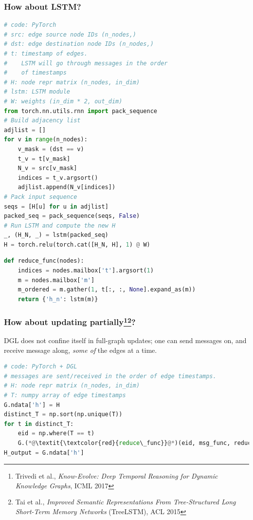 \documentclass[10pt,aspectratio=169]{beamer}
\begin{document}
	\begin{frame}[fragile]
		\frametitle{How about LSTM?}
		\begin{minipage}{0.5\textwidth}
\begin{lstlisting}[language=Python]
# code: PyTorch
# src: edge source node IDs (n_nodes,)
# dst: edge destination node IDs (n_nodes,)
# t: timestamp of edges.
#    LSTM will go through messages in the order
#    of timestamps
# H: node repr matrix (n_nodes, in_dim)
# lstm: LSTM module
# W: weights (in_dim * 2, out_dim)
from torch.nn.utils.rnn import pack_sequence
# Build adjacency list
adjlist = []
for v in range(n_nodes):
    v_mask = (dst == v)
    t_v = t[v_mask]
    N_v = src[v_mask]
    indices = t_v.argsort()
    adjlist.append(N_v[indices])
# Pack input sequence
seqs = [H[u] for u in adjlist]
packed_seq = pack_sequence(seqs, False)
# Run LSTM and compute the new H
_, (H_N, _) = lstm(packed_seq)
H = torch.relu(torch.cat([H_N, H], 1) @ W)
\end{lstlisting}
		\end{minipage}%
		\begin{minipage}{0.5\textwidth}
\begin{lstlisting}[language=Python]
def reduce_func(nodes):
    indices = nodes.mailbox['t'].argsort(1)
    m = nodes.mailbox['m']
    m_ordered = m.gather(1, t[:, :, None].expand_as(m))
    return {'h_n': lstm(m)}
\end{lstlisting}
		\end{minipage}
	\end{frame}

	\begin{frame}[fragile]
		\frametitle{How about updating partially\footnote{Trivedi et al., \emph{Know-Evolve: Deep Temporal Reasoning for Dynamic Knowledge Graphs}, ICML 2017}\footnote{Tai et al., \emph{Improved Semantic Representations From Tree-Structured Long Short-Term Memory Networks}  (TreeLSTM), ACL 2015}?}
		DGL does not confine itself in full-graph updates; one can send messages on, and receive message along, \emph{some of} the edges at a time.
		\begin{center}
			\centering
			\begin{minipage}{0.5\textwidth}
\begin{lstlisting}[language=Python]
# code: PyTorch + DGL
# messages are sent/received in the order of edge timestamps.
# H: node repr matrix (n_nodes, in_dim)
# T: numpy array of edge timestamps
G.ndata['h'] = H
distinct_T = np.sort(np.unique(T))
for t in distinct_T:
    eid = np.where(T == t)
    G.(*@\textit{\textcolor{red}{reduce\_func}}@*)(eid, msg_func, reduce_func)
H_output = G.ndata['h']
\end{lstlisting}
			\end{minipage}
		\end{center}
	\end{frame}
\end{document}
